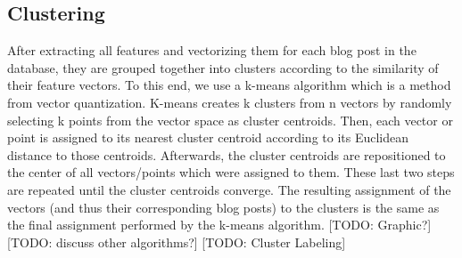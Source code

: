 \subsection{Clustering}
\label{sec:clustering}

After extracting all features and vectorizing them for each blog post in the database, they are grouped together into clusters according to the similarity of their feature vectors. To this end, we use a k-means algorithm which is a method from vector quantization.
K-means creates k clusters from n vectors by randomly selecting k points from the vector space as cluster centroids. Then, each vector or point is assigned to its nearest cluster centroid according to its Euclidean distance to those centroids. Afterwards, the cluster centroids are repositioned to the center of all vectors/points which were assigned to them. These last two steps are repeated until the cluster centroids converge. The resulting assignment of the vectors (and thus their corresponding blog posts) to the clusters is the same as the final assignment performed by the k-means algorithm. [TODO: Graphic?]
[TODO: discuss other algorithms?]
[TODO: Cluster Labeling]
